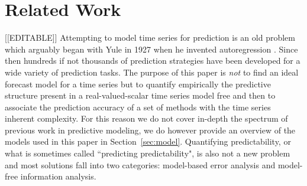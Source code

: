 \section{Related Work }\label{sec:related}
{\color{blue}[[EDITABLE]]}
Attempting to model time series for prediction is an old problem which arguably began with Yule in 1927 when he invented autoregression \cite{Yule27}. Since then hundreds if not thousands of prediction strategies have been developed for a wide variety of prediction tasks. The purpose of this paper is \emph{not} to find an ideal forecast model for a time series but to quantify empirically the predictive structure present in a real-valued-scalar time series model free and then to associate the prediction accuracy of a set of methods with the time series inherent complexity. For this reason we do not cover in-depth the spectrum of previous work in predictive modeling, we do however provide an overview of the models used in this paper in  Section~\ref{sec:model}. Quantifying predictability, or what is sometimes called ``predicting predictability", is also not a new problem and most solutions fall into two categories: model-based error analysis and model-free information analysis.





